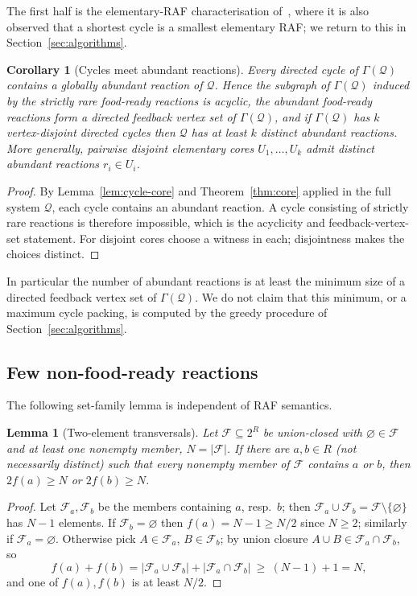 \documentclass[11pt,a4paper]{article}
\theoremstyle{plain}
\newtheorem{lemma}[theorem]{Lemma}
\newtheorem{corollary}[theorem]{Corollary}
\theoremstyle{definition}
\theoremstyle{remark}
\newcommand{\FF}{\mathcal F}
\newcommand{\QQ}{\mathcal Q}
\begin{document}
The first half is the elementary-RAF characterisation of~\cite{steel2019autocatalytic}, where
it is also observed that a shortest cycle is a smallest elementary RAF; we return to this in
Section~\ref{sec:algorithms}.

\begin{corollary}[Cycles meet abundant reactions]\label{cor:cycles}
Every directed cycle of $\Gamma(\QQ)$ contains a globally abundant reaction of $\QQ$.
Hence the subgraph of $\Gamma(\QQ)$ induced by the strictly rare food-ready reactions is
acyclic, the abundant food-ready reactions form a directed feedback vertex set of
$\Gamma(\QQ)$, and if $\Gamma(\QQ)$ has $k$ vertex-disjoint directed cycles then $\QQ$ has at
least $k$ distinct abundant reactions. More generally, pairwise disjoint elementary cores
$U_1,\dots,U_k$ admit distinct abundant reactions $r_i\in U_i$.
\end{corollary}
\begin{proof}
By Lemma~\ref{lem:cycle-core} and Theorem~\ref{thm:core} applied in the full system $\QQ$,
each cycle contains an abundant reaction. A cycle consisting of strictly rare reactions is
therefore impossible, which is the acyclicity and feedback-vertex-set statement. For
disjoint cores choose a witness in each; disjointness makes the choices distinct.
\end{proof}

In particular the number of abundant reactions is at least the minimum size of a directed
feedback vertex set of $\Gamma(\QQ)$. We do not claim that this minimum, or a maximum cycle
packing, is computed by the greedy procedure of Section~\ref{sec:algorithms}.

\subsection{Few non-food-ready reactions}

The following set-family lemma is independent of RAF semantics.

\begin{lemma}[Two-element transversals]\label{lem:transversal}
Let $\FF\subseteq2^R$ be union-closed with $\varnothing\in\FF$ and at least one nonempty member,
$N=|\FF|$. If there are $a,b\in R$ (not necessarily distinct) such that every nonempty member
of $\FF$ contains $a$ or $b$, then $2f(a)\ge N$ or $2f(b)\ge N$.
\end{lemma}
\begin{proof}
Let $\FF_a,\FF_b$ be the members containing $a$, resp.\ $b$; then
$\FF_a\cup\FF_b=\FF\setminus\{\varnothing\}$ has $N-1$ elements. If $\FF_b=\varnothing$ then
$f(a)=N-1\ge N/2$ since $N\ge2$; similarly if $\FF_a=\varnothing$. Otherwise pick
$A\in\FF_a$, $B\in\FF_b$; by union closure $A\cup B\in\FF_a\cap\FF_b$, so
\[
f(a)+f(b)=|\FF_a\cup\FF_b|+|\FF_a\cap\FF_b|\ \ge\ (N-1)+1=N,
\]
and one of $f(a),f(b)$ is at least $N/2$.
\end{proof}
\end{document}
